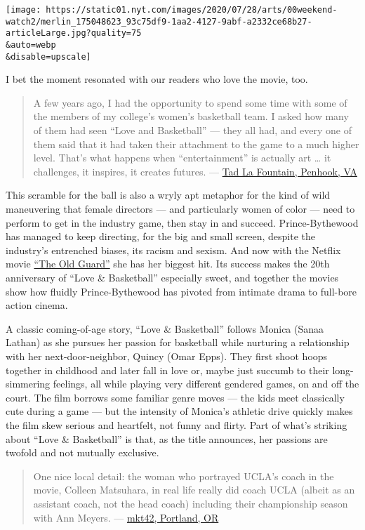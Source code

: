 \texttt{[image: https://static01.nyt.com/images/2020/07/28/arts/00weekend-watch2/merlin\_175048623\_93c75df9-1aa2-4127-9abf-a2332ce68b27-articleLarge.jpg?quality=75\\\&auto=webp\\\&disable=upscale]}

I bet the moment resonated with our readers who love the movie, too.

\begin{quote}
A few years ago, I had the opportunity to spend some time with some of
the members of my college's women's basketball team. I asked how many of
them had seen ``Love and Basketball'' --- they all had, and every one of
them said that it had taken their attachment to the game to a much
higher level. That's what happens when ``entertainment'' is actually art
\ldots{} it challenges, it inspires, it creates futures. ---
\href{https://nyti.ms/2BBSKXY\#permid=108296512}{Tad La Fountain,
Penhook, VA}
\end{quote}

This scramble for the ball is also a wryly apt metaphor for the kind of
wild maneuvering that female directors --- and particularly women of
color --- need to perform to get in the industry game, then stay in and
succeed. Prince-Bythewood has managed to keep directing, for the big and
small screen, despite the industry's entrenched biases, its racism and
sexism. And now with the Netflix movie
\href{https://www.nytimes.com/2020/07/09/movies/the-old-guard-review.html}{``The
Old Guard''} she has her biggest hit. Its success makes the 20th
anniversary of ``Love \& Basketball'' especially sweet, and together the
movies show how fluidly Prince-Bythewood has pivoted from intimate drama
to full-bore action cinema.

A classic coming-of-age story, ``Love \& Basketball'' follows Monica
(Sanaa Lathan) as she pursues her passion for basketball while nurturing
a relationship with her next-door-neighbor, Quincy (Omar Epps). They
first shoot hoops together in childhood and later fall in love or, maybe
just succumb to their long-simmering feelings, all while playing very
different gendered games, on and off the court. The film borrows some
familiar genre moves --- the kids meet classically cute during a game
--- but the intensity of Monica's athletic drive quickly makes the film
skew serious and heartfelt, not funny and flirty. Part of what's
striking about ``Love \& Basketball'' is that, as the title announces,
her passions are twofold and not mutually exclusive.

\begin{quote}
One nice local detail: the woman who portrayed UCLA's coach in the
movie, Colleen Matsuhara, in real life really did coach UCLA (albeit as
an assistant coach, not the head coach) including their championship
season with Ann Meyers. ---
\href{https://nyti.ms/330VJEy\#permid=108316663}{mkt42, Portland, OR}
\end{quote}

